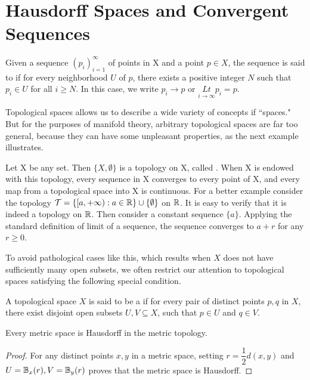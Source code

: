 \documentclass[11pt,a4paper]{article}
\begin{document}
\section{Hausdorff Spaces and Convergent Sequences}

\begin{definition}
    Given a sequence $(p_i)_{i=1}^\infty$ of points in X and a point $p\in X$, the sequence is said to  if for every neighborhood $U$ of $p$, there exists a positive integer $N$ such that $p_i\in U$ for all $i\ge N$. In this case, we write $p_i\rightarrow p$ or $\underset{i\rightarrow\infty}{Lt} p_i=p$.
\end{definition}

Topological spaces allows us to describe a wide variety of concepts if ``spaces." But for the purposes of manifold theory, arbitrary topological spaces are far too general, because they can have some unpleasant properties, as the next example illustrates.

\begin{example}
    Let X be any set. Then $\{X,\emptyset\}$ is a topology on X, called . When X is endowed with this topology, every sequence in X converges to every point of X, and every map from a topological space into X is continuous. For a better example consider the topology $\mathcal{T} = \{[a,+\infty):a\in\mathbb{R}\}\cup \{\emptyset\}$ on $\mathbb{R}$. It is easy to verify that it is indeed a topology on $\mathbb{R}$. Then consider a constant sequence $\{a\}$. Applying the standard definition of limit of a sequence, the sequence converges to $a+r$ for any $r\ge 0$.
\end{example}

To avoid pathological cases like this, which results when $X$ does not have sufficiently many open subsets, we often restrict our attention to topological spaces satisfying the following special condition.

\begin{definition}
A topological space $X$ is said to be a  if for every pair of distinct points $p,q$ in $X$, there exist disjoint open subsets $U,V\subseteq X$, such that $p\in U$ and $q\in V$.
\end{definition}

\begin{proposition}
Every metric space is Hausdorff in the metric topology.
\end{proposition}

\begin{proof}
    For any distinct points $x,y$ in a metric space, setting $r = \dfrac{1}{2}d(x,y)$ and $U = \mathbb{B}_x(r), V = \mathbb{B}_y(r)$ proves that the metric space is Hausdorff. 
\end{proof}
\end{document}
